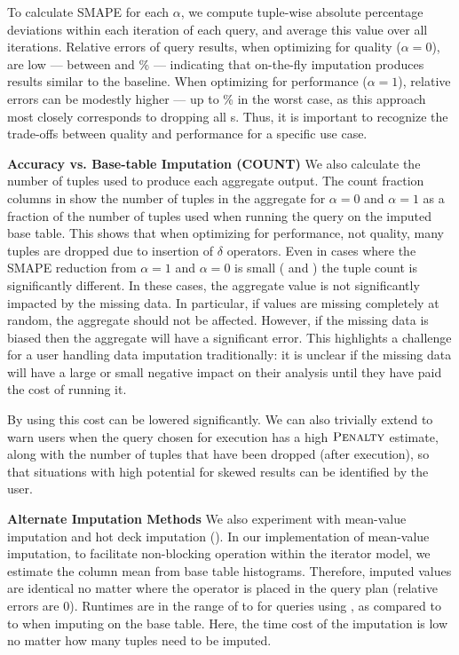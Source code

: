 {To calculate SMAPE for each $\alpha$,
we compute tuple-wise absolute percentage deviations within each iteration of each query, and
average this value over all iterations.
Relative errors of query results, when optimizing for quality
($\alpha=0$), are low --- between \lowsmapealphazero{} and
\highsmapealphazero{}\% --- indicating that on-the-fly imputation produces
results similar to the baseline. When optimizing for performance ($\alpha=1$),
relative errors can be modestly higher --- up to \highsmapealphaone{}\% in the
worst case, as this approach most closely corresponds to dropping all
\nullv{}s. Thus, it is important to recognize the trade-offs between quality and
performance for a specific use case.

\textbf{Accuracy vs. Base-table Imputation (COUNT)}\quad
We also calculate the number of tuples used to produce each aggregate output.
The count fraction columns in  show the number of tuples in the aggregate for $\alpha = 0$ and $\alpha = 1$ as a fraction of the number of tuples used when running the query on the imputed base table.
This shows that when optimizing for performance, not quality, many tuples are dropped due to
insertion of $\delta$ operators.
Even in cases where the SMAPE reduction from $\alpha = 1$ and $\alpha = 0$ is small
( and ) the tuple count is significantly different.
In these cases, the aggregate value is not significantly impacted by the missing data. In
particular, if values are missing completely at random,
the aggregate should not be affected.
However, if the missing data is biased then the aggregate will have a significant error.
This highlights a challenge for a user handling data imputation traditionally: it is unclear if the missing data will have a large or small negative impact on their analysis until they have paid the cost of running it.

By using \ProjectName{} this cost can be lowered significantly. We can also trivially extend \ProjectName{} to warn users when the query chosen for execution has a high
$\textsc{Penalty}$ estimate, along with the number of tuples that have been dropped (after execution), so that situations with high potential for skewed results can be identified by the user.

\textbf{Alternate Imputation Methods}\quad
We also experiment with mean-value imputation and hot deck imputation
(). In our implementation of mean-value imputation, to facilitate
non-blocking operation within the iterator model, we estimate the column mean from base
table histograms. Therefore, imputed values are identical no matter where the operator is
placed in the query plan (relative errors are $0$). Runtimes are in the range of
\runtimemeanlow{} to \runtimemeanhigh{} for queries using \ProjectName{}, as compared to
\runtimemeanlowbase{} to \runtimemeanhighbase{} when imputing on the base table.  Here, the
time cost of the imputation is low no matter how many tuples need to be imputed.  

}
